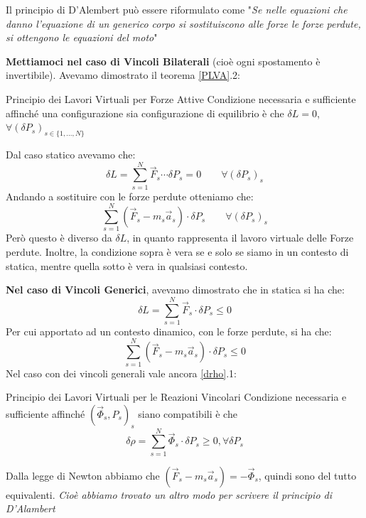 \documentclass[11pt,a4paper,twoside]{article}
\theoremstyle{definition}
\begin{document}
Il principio di D'Alembert può essere riformulato come "\textit{Se nelle equazioni che danno l'equazione di un generico corpo si sostituiscono alle forze le forze perdute, si ottengono le equazioni del moto}"

\textbf{Mettiamoci nel caso di Vincoli Bilaterali} (cioè ogni spostamento è invertibile). Avevamo dimostrato il teorema \ref{PLVA}.2:

\begin{thm}{Principio dei Lavori Virtuali per Forze Attive}{}{}
	Condizione necessaria e sufficiente affinché una configurazione sia configurazione di equilibrio è che $\delta L = 0$, $\forall (\delta P_s)_{s \in \{1,...,N\}}$
\end{thm}
Dal caso statico avevamo che:
\[ \delta L = \sum_{s=1}^N \vec F_s\cdots \delta P_s = 0 \qquad \forall (\delta P_s)_s \]
Andando a sostituire con le forze perdute otteniamo che:
\[ \sum_{s=1}^N (\vec F_s - m_s \vec a_s) \cdot \delta P_s\qquad \forall (\delta P_s)_s \]
Però questo è diverso da $\delta L$, in quanto rappresenta il lavoro virtuale delle Forze perdute. Inoltre, la condizione sopra è vera se e solo se siamo in un contesto di statica, mentre quella sotto è vera in qualsiasi contesto.

\textbf{Nel caso di Vincoli Generici}, avevamo dimostrato che in statica si ha che:
\[ \delta L = \sum_{s = 1}^N \vec F_s \cdot \delta P_s \leq 0 \]
Per cui apportato ad un contesto dinamico, con le forze perdute, si ha che:
\[ \sum_{s=1}^N \left( \vec F_s - m_s \vec a_s \right)\cdot \delta P_s \leq 0 \]
Nel caso con dei vincoli generali vale ancora \ref{drho}.1:
\begin{thm}{Principio dei Lavori Virtuali per le Reazioni Vincolari}{}
	Condizione necessaria e sufficiente affinché $(\vec \Phi_s, P_s)_s$ siano compatibili è che
	\[\delta \rho = \sum_{s=1}^N \vec \Phi_s \cdot \delta P_s \geq 0, \forall \delta P_s\]
\end{thm}

Dalla legge di Newton abbiamo che $(\vec F_s - m_s \vec a_s) = - \vec \Phi_s$, quindi sono del tutto equivalenti. \textit{Cioè abbiamo trovato un altro modo per scrivere il principio di D'Alambert}
\end{document}
